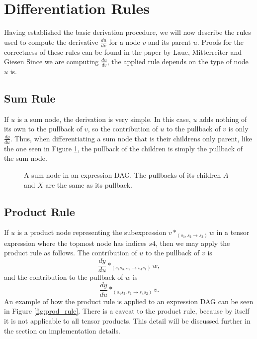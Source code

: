 \documentclass[12pt, a4paper]{report}
\begin{document}
\section{Differentiation Rules}
Having established the basic derivation procedure, we will now describe the rules used to compute the derivative $\frac{du}{dv}$ for a node $v$ and its parent $u$.
Proofs for the correctness of these rules can be found in the paper by Laue, Mitterreiter and Giesen %
Since we are computing $\frac{du}{dv}$, the applied rule depends on the type of node $u$ is.

\subsection{Sum Rule}
If $u$ is a sum node, the derivation is very simple.
In this case, $u$ adds nothing of its own to the pullback of $v$, so the contribution of $u$ to the pullback of $v$ is only $\frac{dy}{du}$.
Thus, when differentiating a sum node that is their childrens only parent, like the one seen in Figure \ref{fig:sum_rule}, the pullback of the children is simply the pullback of the sum node.

\begin{figure}
    \centering
    \caption{A sum node in an expression DAG. The pullbacks of its children $A$ and $X$ are the same as its pullback.}
    \label{fig:sum_rule}
\end{figure}

\subsection{Product Rule}
If $u$ is a product node representing the subexpression $v *_{(s_1,s_2 \rightarrow s_3)} w$ in a tensor expression where the topmost node has indices $s4$, then we may apply the product rule as follows.
The contribution of $u$ to the pullback of $v$ is 
$$
\frac{dy}{du} *_{(s_4s_3,s_2 \rightarrow s_4s_1)} w,
$$
and the contribution to the pullback of $w$ is 
$$
\frac{dy}{du} *_{(s_4s_3,s_1 \rightarrow s_4s_2)} v.
$$
An example of how the product rule is applied to an expression DAG can be seen in Figure \ref{fig:prod_rule}.
There is a caveat to the product rule, because by itself it is not applicable to all tensor products.
This detail will be discussed further in the section on implementation details.
\end{document}
